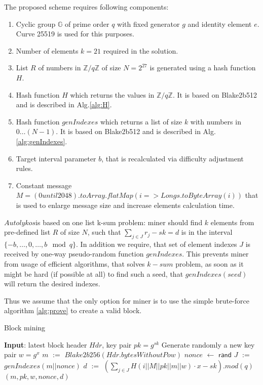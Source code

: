 \documentclass[]{article}
\newcommand{\Name}{$Autolykos$}
\def\Let#1#2{\State #1 $:=$ #2}
\def\LetRnd#1#2{\State #1 $\gets$ #2}
\begin{document}
    The proposed scheme requires following components:
    \begin{enumerate}
        \item Cyclic group $\mathbb{G}$ of prime order $q$ with fixed generator $g$
        and identity element $e$.
        Curve 25519 is used for this purposes.
        \item Number of elements $k=21$ required in the solution.
        \item List $R$ of numbers in $\mathbb{Z}/q\mathbb{Z}$ of size $N=2^{27}$ is generated
        using a hash function $H$.
        \item Hash function $H$ which returns the values in $\mathbb{Z}/q\mathbb{Z}$.
        It is based on Blake2b512 and is described in Alg.\ref{alg:H}.
        \item Hash function $genIndexes$ which returns a list of size $k$ with numbers in $0\dots (N-1)$.
        It is based on Blake2b512 and is described in Alg.\ref{alg:genIndexes}.
        \item Target interval parameter $b$, that is recalculated via difficulty adjustment rules.
        \item Constant message $M=(0 until 2048).toArray.flatMap(i => Longs.toByteArray(i))$ that is used to enlarge message size and increase elements calculation time.
    \end{enumerate}

    \Name is based on one list k-sum problem: miner should find
    $k$ elements from pre-defined list $R$ of size $N$, such that
    $\sum_{j \in J} r_{j} - sk = d$ is in the interval $\{-b,\dots,0,\dots,b\mod q\}$.
    In addition we require, that set of element indexes $J$ is received
    by one-way pseudo-random function $genIndexes$. This prevents miner
    from usage of efficient algorithms, that solves $k-sum$ problem, as
    soon as it might be hard (if possible at all) to find such a seed,
    that $genIndexes(seed)$ will return the desired indexes.

    Thus we assume that the only option for miner is to use the simple brute-force algorithm \ref{alg:prove} to
    create a valid block.

    \begin{algorithm}[H]
        \caption{Block mining}
        \label{alg:prove}
        \begin{algorithmic}[1]
            \State \textbf{Input}: latest block header $Hdr$, key pair $pk=g^{sk}$
            \State Generate randomly a new key pair $w=g^x$
            \Let{$m$}{$Blake2b256(Hdr.bytesWithoutPow)$}
                \LetRnd{$nonce$}{$\mathsf{rand}$}
                \Let{$J$}{$genIndexes(m||nonce)$}
                \Let{$d$}{$(\sum_{j \in J}{H(i||M||pk||m||w)} \cdot x - sk).mod(q)$}
                \State \Return $(m,pk,w,nonce,d)$
                \EndIf
            \EndWhile
        \end{algorithmic}
    \end{algorithm}
\end{document}
